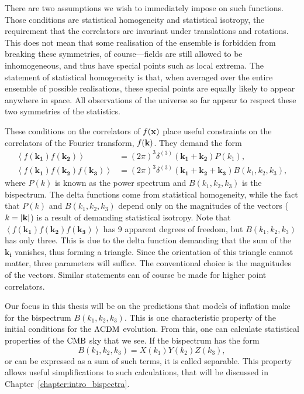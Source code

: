    There are two assumptions we wish to immediately impose on such functions.
    Those conditions are statistical homogeneity and statistical isotropy,
    the requirement that the correlators are invariant under translations and rotations.
    This does not mean that some realisation of the ensemble is forbidden from
    breaking these symmetries, of course---fields
    are still allowed to be inhomogeneous, and thus have special points such as local extrema.
    The statement of statistical homogeneity is that,
    when averaged over the entire ensemble of possible realisations, these special points
    are equally likely to appear anywhere in space.
    All observations of the universe so far appear to respect these two symmetries of the statistics.


    These conditions on the correlators of $f(\mathbf{x})$ place useful constraints on the correlators of the
    Fourier transform, $f(\mathbf{k})$. They demand the form
    \begin{align}\label{spectrum_definitions}
        \left<f(\mathbf{k_1})f(\mathbf{k_2})\right> &= (2\pi)^3\delta^{(3)}(\mathbf{k_1}+\mathbf{k_2})P(k_1),\\
        \left<f(\mathbf{k_1})f(\mathbf{k_2})f(\mathbf{k_3})\right> &= (2\pi)^3\delta^{(3)}(\mathbf{k_1}+\mathbf{k_2}+\mathbf{k_3})B(k_1,k_2,k_3),
    \end{align}
    where $P(k)$ is known as the power spectrum and $B(k_1,k_2,k_3)$ is the bispectrum.
    The delta functions come from statistical homogeneity, while the fact that $P(k)$
    and $B(k_1,k_2,k_3)$ depend only on the magnitudes of the vectors ($k=\left|\mathbf{k}\right|$) is a result
    of demanding statistical isotropy.
    Note that $\left<f(\mathbf{k_1})f(\mathbf{k_2})f(\mathbf{k_3})\right>$
    has $9$ apparent degrees of freedom, but $B(k_1,k_2,k_3)$ has only three.
    This is due to the delta function
    demanding that the sum of the $\mathbf{k_i}$ vanishes, thus forming a triangle.
    Since the orientation of this triangle
    cannot matter, three parameters will suffice. The conventional choice is
    the magnitudes of the vectors.
    Similar statements can of course be made for higher point correlators.


    Our focus in this thesis will be on the predictions that models of inflation make
    for the bispectrum $B(k_1,k_2,k_3)$.
    This is one characteristic property of 
    the initial conditions for the $\Lambda\text{CDM}$ evolution. From
    this, one can calculate statistical properties of the $\text{CMB}$ sky that we see.
    If the bispectrum has the form
    \begin{equation}\label{sepXYZ}
        B(k_1,k_2,k_3) = X(k_1)Y(k_2)Z(k_3),
    \end{equation}
    or can be expressed as a sum of such terms, it is called separable.
    This property allows useful simplifications to such calculations, that
    will be discussed in Chapter~\ref{chapter:intro_bispectra}.


